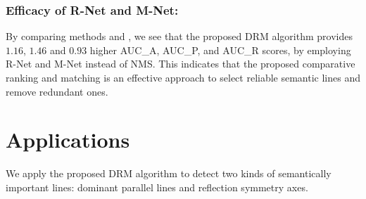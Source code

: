 \documentclass[runningheads]{llncs}
\newcommand{\RomNum}[1]{\MakeUppercase{\romannumeral #1}}
\begin{document}
\subsubsection{Efficacy of R-Net and M-Net:}
By comparing methods \RomNum{4} and \RomNum{5}, we see that the proposed DRM algorithm provides $1.16$, $1.46$ and $0.93$ higher AUC\_A, AUC\_P, and AUC\_R scores, by employing R-Net and M-Net instead of NMS. This indicates that the proposed comparative ranking and matching is an effective approach to select reliable semantic lines and remove redundant ones.

\section{Applications}
We apply the proposed DRM algorithm to detect two kinds of semantically important lines: dominant parallel lines and reflection symmetry axes.
\end{document}
